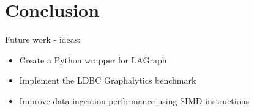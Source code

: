\section{Conclusion}
\label{sec:conclusion}

Future work - ideas:

\begin{itemize}
    \item Create a Python wrapper for LAGraph
    \item Implement the LDBC Graphalytics benchmark~\cite{DBLP:journals/pvldb/IosupHNHPMCCSAT16}
    \item Improve data ingestion performance using \eg SIMD instructions~\cite{DBLP:journals/vldb/LangdaleL19}
\end{itemize}
